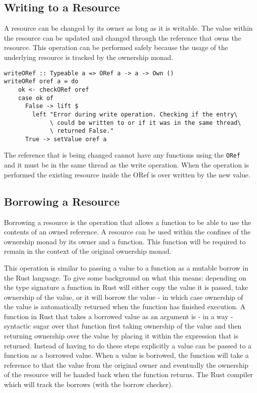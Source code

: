 \documentclass[onehalf,11pt]{beavtex}
\begin{document}
\subsection{Writing to a Resource}

A resource can be changed by its owner as long as it is writable.
The value within the resource can be updated and changed through the reference
that owns the resource. This operation can be performed safely because the usage
of the underlying resource is tracked by the ownership monad.

\begin{verbatim}
writeORef :: Typeable a => ORef a -> a -> Own ()
writeORef oref a = do
    ok <- checkORef oref
    case ok of
      False -> lift $
        left "Error during write operation. Checking if the entry\
             \ could be written to or if it was in the same thread\
             \ returned False."
      True -> setValue oref a
\end{verbatim}

The reference that is being changed cannot have any functions using the
\texttt{ORef} and it must be in the same thread as the write operation.
When the operation is performed the existing resource inside the ORef is over
written by the new value.

\subsection{Borrowing a Resource}

Borrowing a resource is the operation that allows a function to be able to use
the contents of an owned reference.
A resource can be used within the confines of the ownership monad by its owner
and a function. This function will be required to remain in the
context of the original ownership monad.

This operation is similar to passing a value to a function as a mutable
borrow in the Rust language.
To give some background on what this means:
depending on the type signature a function in Rust will either copy the value
it is passed, take ownership of the value, or it will borrow the value - in
which case ownership of the value is automatically returned when the function
has finished execution.\cite{rust_book_ownership}
A function in Rust that takes a borrowed value as an argument is - in a way -
syntactic sugar over that function first taking ownership of the value and then
returning ownership over the value by placing it within the expression that is
returned.
Instead of having to do these steps explicitly a value can be passed to a
function as a borrowed value.  When a value is borrowed, the function will take
a reference to that the value from the original owner and eventually the
ownership of the resource will be handed back when the function returns.
The Rust compiler which will track the borrows (with the borrow checker).
\end{document}
